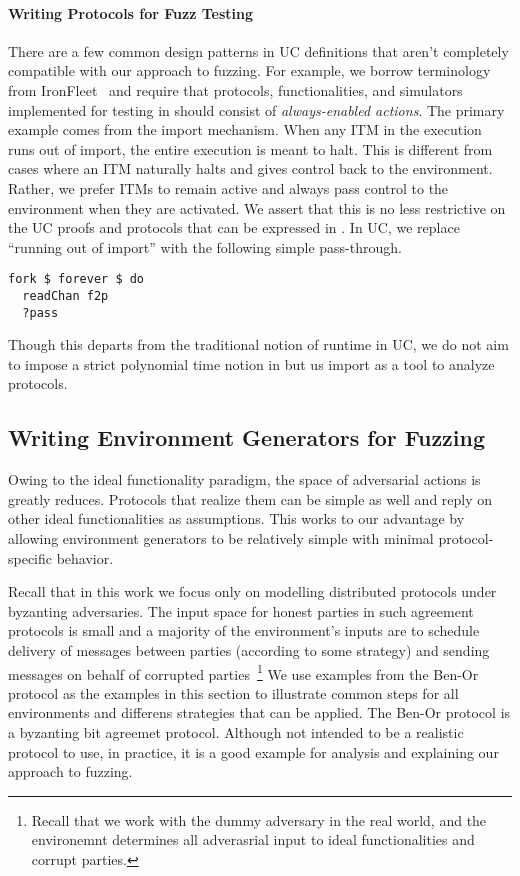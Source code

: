 \paragraph{Writing Protocols for Fuzz Testing}
There are a few common design patterns in UC definitions that aren't completely compatible with our approach to fuzzing.
For example, we borrow terminology from IronFleet~\cite{ironfleet} and require that protocols, functionalities, and simulators implemented for testing in \us should consist of \emph{always-enabled actions}.
The primary example comes from the import mechanism. When any ITM in the execution runs out of import, the entire execution is meant to halt.
This is different from cases where an ITM naturally halts and gives control back to the environment.
Rather, we prefer ITMs to remain active and always pass control to the environment when they are activated. 
We assert that this is no less restrictive on the UC proofs and protocols that can be expressed in \us.
In UC, we replace ``running out of import'' with the following simple pass-through.
\begin{lstlisting}
fork $ forever $ do
  readChan f2p
  ?pass
\end{lstlisting}
Though this departs from the traditional notion of runtime in UC, we do not aim to impose a strict polynomial time notion in \us
but us import as a tool to analyze protocols.

\subsection{Writing Environment Generators for Fuzzing}
Owing to the ideal functionality paradigm, the space of adversarial actions is greatly reduces.
Protocols that realize them can be simple as well and reply on other ideal functionalities as assumptions.
This works to our advantage by allowing environment generators to be relatively simple with minimal protocol-specific behavior. 

Recall that in this work we focus only on modelling distributed protocols under byzanting adversaries. 
The input space for honest parties in such agreement protocols is small and a majority of the environment's inputs are to schedule delivery of messages between parties (according to some strategy) and sending messages on behalf of corrupted parties~\footnote{Recall that we work with the dummy adversary in the real world, and the environemnt determines all adverasrial input to ideal functionalities and corrupt parties.}
We use examples from the Ben-Or protocol as the examples in this section to illustrate common steps for all environments and differens strategies that can be applied.
The Ben-Or protocol is a byzanting bit agreemet protocol. Although not intended to be a realistic protocol to use, in practice, it is a good example for analysis and explaining our approach to fuzzing.
